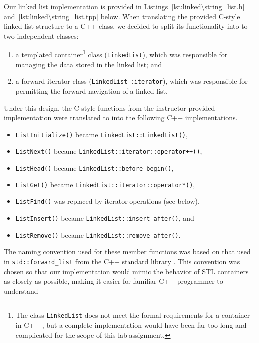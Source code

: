 \documentclass[11pt, letterpaper]{article} %
\begin{document}
Our linked list implementation is provided in Listings~\ref{lst:linked\string_list.h} and~\ref{lst:linked\string_list.tpp} below. When translating the provided C-style linked list structure to a C++ class, we decided to split its functionality into to two independent classes:
\begin{enumerate}
    \item a templated container\footnote{The class \texttt{LinkedList} does not meet the formal requirements for a container in C++ \cite[\S26.2.1]{open-std-N4659}, but a complete implementation would have been far too long and complicated for the scope of this lab assignment.} class (\texttt{LinkedList}), which was responsible for managing the data stored in the linked list; and
    \item a forward iterator \cite[\S27.2.5]{open-std-N4659} class (\texttt{LinkedList::iterator}), which was responsible for permitting the forward navigation of a linked list.
\end{enumerate}


Under this design, the C-style functions from the instructor-provided implementation were translated to into the following C++ implementations.
\begin{itemize}
    \item \texttt{ListInitialize()} became \texttt{LinkedList::LinkedList()},
    \item \texttt{ListNext()} became \texttt{LinkedList::iterator::operator++()},
    \item \texttt{ListHead()} became \texttt{LinkedList::before\_begin()},
    \item \texttt{ListGet()} became \texttt{LinkedList::iterator::operator*()},
    \item \texttt{ListFind()} was replaced by iterator operations (see below),
    \item \texttt{ListInsert()} became \texttt{LinkedList::insert\_after()}, and
    \item \texttt{ListRemove()} became \texttt{LinkedList::remove\_after()}.
\end{itemize}

The naming convention used for these member functions was based on that used in \texttt{std::forward\_list} from the C++ standard library \cite{cppreference-forward-list}. This convention was chosen so that our implementation would mimic the behavior of STL containers as closely as possible, making it easier for familiar C++ programmer to understand \cite[C.100]{stroustrup-c++-core-guidelines}
\end{document}
